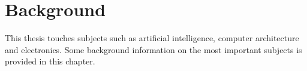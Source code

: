 \chapter{Background}

This thesis touches subjects such as artificial intelligence, computer
architecture and electronics. Some background information on the most important
subjects is provided in this chapter.







